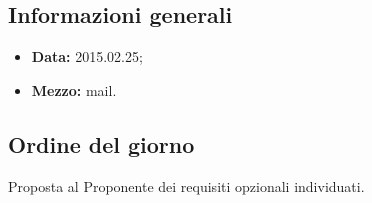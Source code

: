 \subsection{Informazioni generali}
\begin{itemize}
	\item \textbf{Data:} 2015.02.25;
	\item \textbf{Mezzo:} mail.
\end{itemize}

\subsection{Ordine del giorno}
Proposta al Proponente dei requisiti opzionali individuati.

